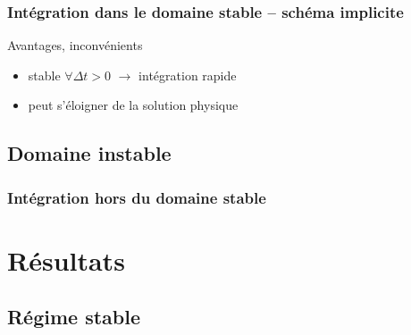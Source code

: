 \documentclass[french]{beamer}
\begin{document}
\begin{frame}
  \frametitle{Intégration dans le domaine stable -- schéma implicite}
  {\huge Avantages, inconvénients}
  
  \begin{itemize}
    \item stable $\forall \Delta t > 0$ $\rightarrow$ intégration rapide
    \item peut s'éloigner de la solution physique
  \end{itemize}
  
\end{frame}



\subsection{Domaine instable}

\begin{frame}
  \frametitle{Intégration hors du domaine stable}
  
\end{frame}

\section{Résultats}
\subsection{Régime stable}
\end{document}
